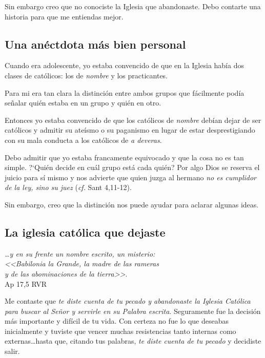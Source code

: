 \documentclass{article}
\begin{document}
Sin embargo creo que no conociste la Iglesia que abandonaste. Debo contarte una historia para que me entiendas mejor.

\subsection{Una an\'ectdota m\'as bien personal}

Cuando era adolescente, yo estaba convencido de que en la Iglesia hab\'{i}a dos clases de cat\'olicos: los de \emph{nombre} y los practicantes.

Para mi era tan clara la distinci\'on entre ambos grupos que f\'acilmente pod\'{i}a se\~nalar qui\'en estaba en un grupo y qui\'en en otro.

Entonces yo estaba convencido de que los cat\'olicos de \emph{nombre} deb\'{i}an dejar de ser cat\'olicos y admitir su ate\'{i}smo o su paganismo en lugar de estar desprestigiando con su mala conducta a los cat\'olicos de \emph{a deveras}.

Debo admitir que yo estaba francamente equivocado y que la cosa no es tan simple. ?`Qui\'en decide en cu\'al grupo est\'a cada qui\'en? Por algo Dios se reserva el juicio para s\'{i} mismo y nos advierte que quien juzga al hermano \emph{no es cumplidor de la ley, sino su juez} (\emph{cf.} Sant 4,11-12).

Sin embargo, creo que la distinci\'on nos puede ayudar para aclarar algunas ideas.

\subsection{La iglesia cat\'olica que dejaste}

\begin{flushright}
\emph{{\ldots}y en su frente un nombre escrito, un misterio:\\
<<Babilonia la Grande, la madre de las rameras\\
y de las abominaciones de la tierra>>}.\\
Ap 17,5 RVR
\end{flushright}

\noindent
Me contaste que \emph{te diste cuenta de tu pecado y abandonaste la Iglesia Cat\'olica para buscar al Se\~nor y servirle en su Palabra escrita}. Seguramente fue la decisi\'on m\'as importante y dif\'{i}cil de tu vida. Con certeza no fue lo que deseabas inicialmente y tuviste que vencer muchas resistencias tanto internas como externas\ldots hasta que, citando tus palabras, \emph{te diste cuenta de tu pecado} y decidiste salir.
\end{document}
